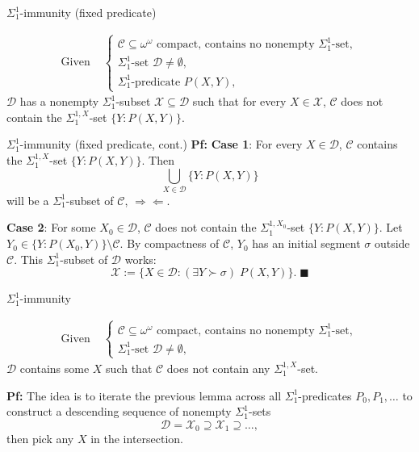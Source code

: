 \begin{frame}{$\Sigma_1^{1}$-immunity (fixed predicate)}
  \begin{lemma*}
    \begin{align*}
      \text{Given } &\begin{cases}
        \mathcal{C}\subseteq\omega^\omega \text{ compact, contains
        no nonempty } \Sigma_1^{1}\text{-set},\\
        \Sigma_1^{1}\text{-set } \mathcal{D}\neq\emptyset,\\
        \Sigma_1^{1}\text{-predicate } P(X,Y),
      \end{cases}
    \end{align*}
    $\mathcal{D}$ has a nonempty $\Sigma_1^{1}$-subset
    $\mathcal{X}\subseteq\mathcal{D}$ such that for every
    $X\in\mathcal{X}$, $\mathcal{C}$ does not contain the
    $\Sigma_1^{1,X}$-set $\{Y:P(X,Y)\}$.
  \end{lemma*}
\end{frame}

\begin{frame}{$\Sigma_1^{1}$-immunity (fixed predicate, cont.)}
  \textbf{Pf:} \textbf{Case 1}: For every $X\in\mathcal{D}$, $\mathcal{C}$
  contains the $\Sigma_1^{1,X}$-set $\{Y:P(X,Y)\}$. Then
  \[\bigcup_{X\in\mathcal{D}} \{Y:P(X,Y)\}\]
  will be a $\Sigma_1^{1}$-subset of $\mathcal{C}$, $\Rightarrow\Leftarrow$.

  \vspace{2em}
  \textbf{Case 2}: For some $X_0\in\mathcal{D}$, $\mathcal{C}$ does not
  contain the $\Sigma_1^{1,X_0}$-set $\{Y:P(X,Y)\}$. Let $Y_0 \in
  \{Y:P(X_0,Y)\} \setminus\mathcal{C}$. By compactness of $\mathcal{C}$,
  $Y_0$ has an initial segment $\sigma$ outside $\mathcal{C}$. This
  $\Sigma_1^{1}$-subset of $\mathcal{D}$ works: \[\mathcal{X}:=
  \{X\in\mathcal{D}: (\exists Y\succ\sigma)\; P(X,Y)\}.\; \blacksquare\]
\end{frame}

\begin{frame}{$\Sigma_1^{1}$-immunity}
  \begin{thm*}
    \begin{align*}
      \text{Given } &\begin{cases}
        \mathcal{C}\subseteq\omega^\omega \text{ compact, contains
        no nonempty } \Sigma_1^{1}\text{-set},\\
        \Sigma_1^{1}\text{-set } \mathcal{D}\neq\emptyset,
      \end{cases}
    \end{align*}
    $\mathcal{D}$ contains some $X$ such that $\mathcal{C}$ does not
    contain any $\Sigma_1^{1,X}$-set.
  \end{thm*}

  \vspace{1em}
  \textbf{Pf:} The idea is to iterate the previous lemma across all
  $\Sigma^1_1$-predicates $P_0,P_1,\ldots$ to construct a descending
  sequence of nonempty $\Sigma^1_1$-sets
  \[\mathcal{D} =\mathcal{X}_0 \supseteq\mathcal{X}_1 \supseteq\ldots,\]
  then pick any $X$ in the intersection.
\end{frame}

